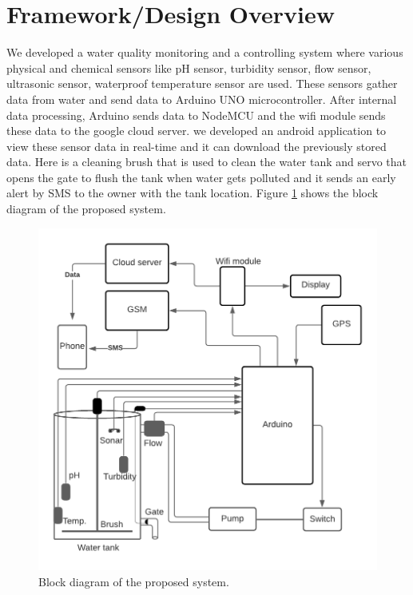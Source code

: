 \section{Framework/Design Overview}
We developed a water quality monitoring and a controlling system where various physical and chemical sensors like pH sensor, turbidity sensor, flow sensor, ultrasonic sensor, waterproof temperature sensor are used. These sensors gather data from water and send data to Arduino UNO microcontroller. After internal data processing, Arduino sends data to NodeMCU and the wifi module sends these data to the google cloud server. we developed an android application to view these sensor data in real-time and it can download the previously stored data. Here is a cleaning brush that is used to clean the water tank and servo that opens the gate to flush the tank when water gets polluted and it sends an early alert by SMS to the owner with the tank location. Figure \ref{block} shows the block diagram of the proposed system.
\begin{figure}[h]
\centering
\includegraphics[width=1.0\textwidth]{figures/Block diagram.png}
\caption{Block diagram of the proposed system.}
\label{block}
\end{figure}


